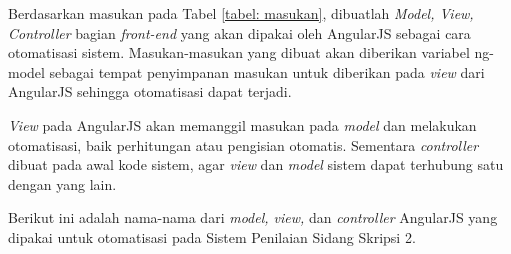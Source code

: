 	Berdasarkan masukan pada Tabel \ref{tabel: masukan}, dibuatlah \textit{Model, View, Controller} bagian \textit{front-end} yang akan dipakai oleh AngularJS sebagai cara otomatisasi sistem. Masukan-masukan yang dibuat akan diberikan variabel ng-model sebagai tempat penyimpanan masukan untuk diberikan pada \textit{view} dari AngularJS sehingga otomatisasi dapat terjadi.
	
	\textit{View} pada AngularJS akan memanggil masukan pada \textit{model} dan melakukan otomatisasi, baik perhitungan atau pengisian otomatis. Sementara \textit{controller} dibuat pada awal kode sistem, agar \textit{view} dan \textit{model} sistem dapat terhubung satu dengan yang lain.
	
	Berikut ini adalah nama-nama dari \textit{model, view,} dan \textit{controller} AngularJS yang dipakai untuk otomatisasi pada Sistem Penilaian Sidang Skripsi 2.
